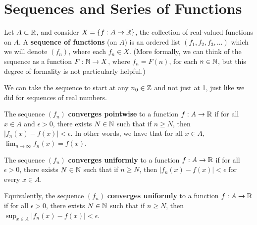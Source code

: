 \documentclass[../main.tex]{subfiles}
\begin{document}
\chapter{Sequences and Series of Functions}
\begin{definition}\label{dfn:17.1}
    Let $A\subset\mathbb{R}$, and consider $X=\{f:A\to\mathbb{R}\}$, the collection of real-valued functions on $A$. A \textbf{sequence of functions} (on $A$) is an ordered list $(f_1,f_2,f_3,\dots)$ which we will denote $(f_n)$, where each $f_n\in X$. (More formally, we can think of the sequence as a function $F:\mathbb{N}\to X$, where $f_n=F(n)$, for each $n\in\mathbb{N}$, but this degree of formality is not particularly helpful.)\par
    We can take the sequence to start at any $n_0\in\mathbb{Z}$ and not just at 1, just like we did for sequences of real numbers.
\end{definition}

\begin{definition}\label{dfn:17.2}
    The sequence $(f_n)$ \textbf{converges pointwise} to a function $f:A\to\mathbb{R}$ if for all $x\in A$ and $\epsilon>0$, there exists $N\in\mathbb{N}$ such that if $n\geq N$, then $|f_n(x)-f(x)|<\epsilon$. In other words, we have that for all $x\in A$, $\lim_{n\to\infty}f_n(x)=f(x)$.
\end{definition}

\begin{definition}\label{dfn:17.3}
    The sequence $(f_n)$ \textbf{converges uniformly} to a function $f:A\to\mathbb{R}$ if for all $\epsilon>0$, there exists $N\in\mathbb{N}$ such that if $n\geq N$, then $|f_n(x)-f(x)|<\epsilon$ for every $x\in A$.\par
    Equivalently, the sequence $(f_n)$ \textbf{converges uniformly} to a function $f:A\to\mathbb{R}$ if for all $\epsilon>0$, there exists $N\in\mathbb{N}$ such that if $n\geq N$, then $\sup_{x\in A}|f_n(x)-f(x)|<\epsilon$.
\end{definition}
\end{document}
